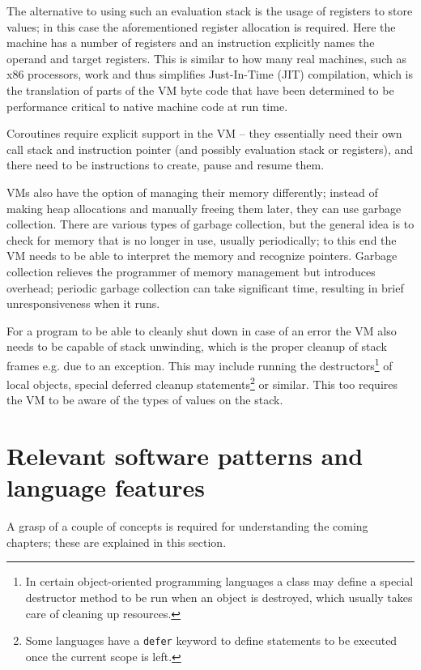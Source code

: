 		The alternative to using such an evaluation stack is the usage of registers to store values; in this case the aforementioned register allocation is required. Here the machine has a number of registers and an instruction explicitly names the operand and target registers. This is similar to how many real machines, such as x86 processors, work and thus simplifies Just-In-Time (JIT) compilation, which is the translation of parts of the VM byte code that have been determined to be performance critical to native machine code at run time.
		
		Coroutines require explicit support in the VM -- they essentially need their own call stack and instruction pointer (and possibly evaluation stack or registers), and there need to be instructions to create, pause and resume them.
		
		VMs also have the option of managing their memory differently; instead of making heap allocations and manually freeing them later, they can use garbage collection. There are various types of garbage collection, but the general idea is to check for memory that is no longer in use, usually periodically; to this end the VM needs to be able to interpret the memory and recognize pointers. Garbage collection relieves the programmer of memory management but introduces overhead; periodic garbage collection can take significant time, resulting in brief unresponsiveness when it runs.
		
		For a program to be able to cleanly shut down in case of an error the VM also needs to be capable of stack unwinding, which is the proper cleanup of stack frames e.g. due to an exception. This may include running the destructors\footnote{In certain object-oriented programming languages a class may define a special destructor method to be run when an object is destroyed, which usually takes care of cleaning up resources.} of local objects, special deferred cleanup statements\footnote{Some languages have a \lstinline$defer$ keyword to define statements to be executed once the current scope is left.} or similar. This too requires the VM to be aware of the types of values on the stack.
	
	\section{Relevant software patterns and language features}
		
		A grasp of a couple of concepts is required for understanding the coming chapters; these are explained in this section.		
		
